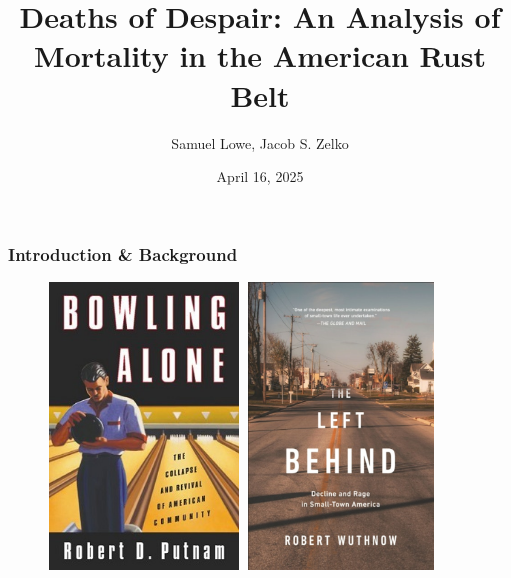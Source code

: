 \documentclass{beamer}
\title{Deaths of Despair: An Analysis of Mortality in the American Rust Belt}
\author{Samuel Lowe, Jacob S. Zelko}
\institute{Northeastern University}
\date{April 16, 2025}
\begin{document}
\frame{\titlepage}

\begin{frame}
    \frametitle{Introduction \& Background}

    \begin{figure}[!htb]
            \includegraphics[height=3in, width=2in]{Bowling_Alone.jpg}
        \endminipage\hfill
            \includegraphics[height=3in, width=2in]{The Left Behind.png}
        \endminipage
    \end{figure}

\end{frame}
\end{document}

